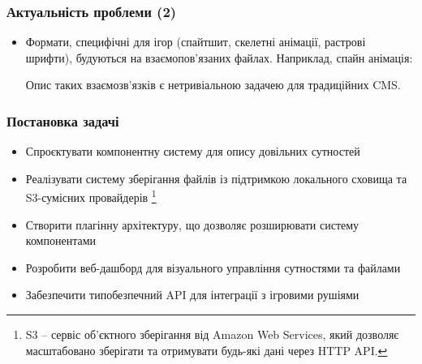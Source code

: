 \documentclass[aspectratio=169]{beamer}
\begin{document}
\begin{frame}
\frametitle{Актуальність проблеми (2)}

  \begin{itemize}
    
    \item Формати, специфічні для ігор (спайтшит, скелетні анімації, растрові шрифти), будуються на взаємопов'язаних файлах. Наприклад, спайн анімація:
    \bigskip
  
    \begin{center}
    \end{center}

    \bigskip

    Опис таких взаємозв'язків є нетривіальною задачею для традиційних CMS.
  \end{itemize}
\end{frame}

\begin{frame}
  \frametitle{Постановка задачі}

  \begin{itemize}
    \item Спроєктувати компонентну систему для опису довільних сутностей
    \item Реалізувати систему зберігання файлів із підтримкою локального сховища та S3-сумісних провайдерів \footnote{S3 -- сервіс об'єктного зберігання від Amazon Web Services, який дозволяє масштабовано зберігати та отримувати будь-які дані через HTTP API.}
    \item Створити плагінну архітектуру, що дозволяє розширювати систему компонентами
    \item Розробити веб-дашборд для візуального управління сутностями та файлами
    \item Забезпечити типобезпечний API для інтеграції з ігровими рушіями
  \end{itemize}
\end{frame}
\end{document}
